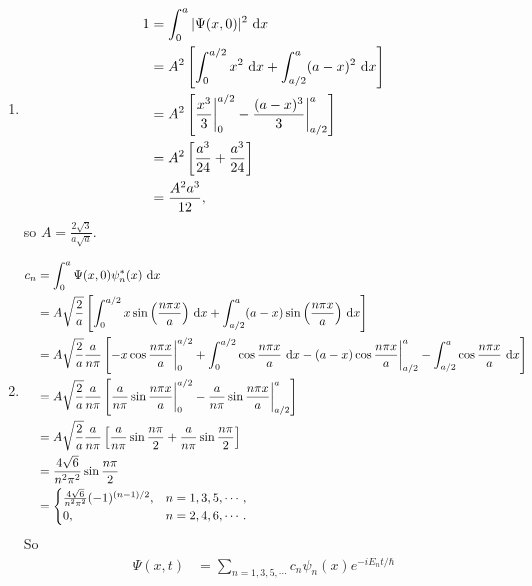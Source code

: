 \documentclass[en, oneside]{vivi}
\begin{document}
\begin{sol}
    \begin{enumerate}[label=(\alph*)]
        \item \begin{align*}
            1 &= \int_{0}^{a}|\Psi(x, 0)|^2 \dif x\\
            &= A^2 \left[ \int_{0}^{a/2}x^2 \dif x + \int_{a/2}^{a}(a - x)^2 \dif x \right]\\
            &= A^2 \left[ \frac{x^3}{3} \bigg|_{0}^{a/2} - \frac{(a - x)^3}{3} \bigg|_{a/2}^{a} \right]\\
            &= A^2 \left[ \frac{a^3}{24} + \frac{a^3}{24} \right]\\
            &= \frac{A^2 a^3}{12},
        \end{align*}
        so $A = \frac{2 \sqrt{3}}{a\sqrt{a}}$.
        \item \begin{align*}
            c_n &= \int_{0}^{a} \Psi(x, 0) \psi_n^*(x) \dif x\\
            &= A \sqrt{\frac{2}{a}} \left[\int_{0}^{a/2} x \sin\left(\frac{n\pi x}{a}\right) \dif x + \int_{a/2}^{a} (a - x) \sin\left(\frac{n\pi x}{a}\right) \dif x\right]\\
            &= A \sqrt{\frac{2}{a}} \frac{a}{n\pi} \left[ -x \cos \frac{n\pi x}{a} \bigg|_{0}^{a/2} + \int_{0}^{a/2} \cos \frac{n\pi x}{a} \dif x - (a - x) \cos \frac{n\pi x}{a} \bigg|_{a/2}^{a} - \int_{a/2}^{a} \cos \frac{n\pi x}{a} \dif x \right]\\
            &= A \sqrt{\frac{2}{a}} \frac{a}{n\pi} \left[\frac{a}{n\pi} \sin \frac{n\pi x}{a} \bigg|_{0}^{a/2} - \frac{a}{n\pi} \sin \frac{n\pi x}{a} \bigg|_{a/2}^{a} \right]\\
            &= A \sqrt{\frac{2}{a}} \frac{a}{n\pi} \left[\frac{a}{n\pi} \sin \frac{n\pi}{2} + \frac{a}{n\pi} \sin \frac{n\pi}{2} \right]\\
            &= \frac{4 \sqrt{6}}{n^2 \pi^2} \sin \frac{n\pi}{2}\\
            &= \begin{cases}
                \frac{4 \sqrt{6}}{n^2 \pi^2} (-1)^{(n - 1)/2}, & n = 1, 3, 5, \cdots,\\
                0, & n = 2, 4, 6, \cdots.
            \end{cases}
        \end{align*}
        So \begin{align*}
            \Psi(x, t) &= \sum_{n = 1, 3, 5, \cdots} c_n \psi_n(x) e^{-iE_n t/\hbar}\\

\end{align*}
\end{enumerate}
\end{sol}
\end{document}
